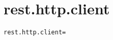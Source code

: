 \section{rest.http.client}
\label{configuration:RestHttpClient}
\ClearAPI
\TODO
\begin{lstlisting}[style=Props,caption={Usage example for \textit{rest.http.client}}]
rest.http.client=
\end{lstlisting}